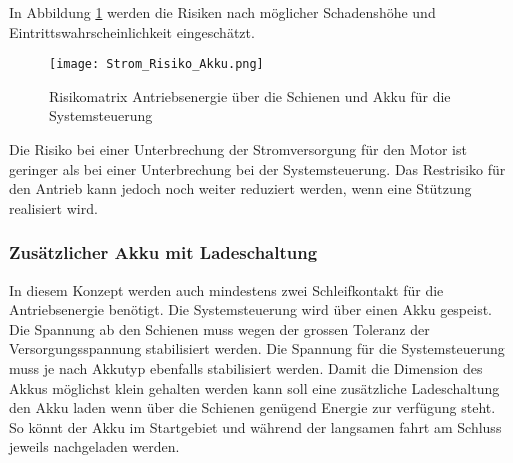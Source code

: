 \documentclass[../../main.tex]{subfiles}
\begin{document}
    In Abbildung \ref{fig:strom_risikomatrix_akku} werden die Risiken nach möglicher Schadenshöhe und Eintrittswahrscheinlichkeit eingeschätzt.

    \begin{figure}[H]
        \centering
        \texttt{[image: Strom\_Risiko\_Akku.png]}
        \caption {Risikomatrix Antriebsenergie über die Schienen und Akku für die Systemsteuerung}
        \label{fig:strom_risikomatrix_akku}
    \end{figure}

    Die Risiko bei einer Unterbrechung der Stromversorgung für den Motor ist geringer als bei einer Unterbrechung bei der Systemsteuerung. Das Restrisiko für den Antrieb kann jedoch noch weiter reduziert werden, wenn eine Stützung realisiert wird.


    \subsubsection{Zusätzlicher Akku mit Ladeschaltung}
    In diesem Konzept werden auch mindestens zwei Schleifkontakt für die Antriebsenergie benötigt. Die Systemsteuerung wird über einen Akku gespeist. Die Spannung ab den Schienen muss wegen der grossen Toleranz der Versorgungsspannung stabilisiert werden. Die Spannung für die Systemsteuerung muss je nach Akkutyp ebenfalls stabilisiert werden.
    Damit die Dimension des Akkus möglichst klein gehalten werden kann soll eine zusätzliche Ladeschaltung den Akku laden wenn über die Schienen genügend Energie zur verfügung steht. So könnt der Akku im Startgebiet und während der langsamen fahrt am Schluss jeweils nachgeladen werden.
\end{document}
